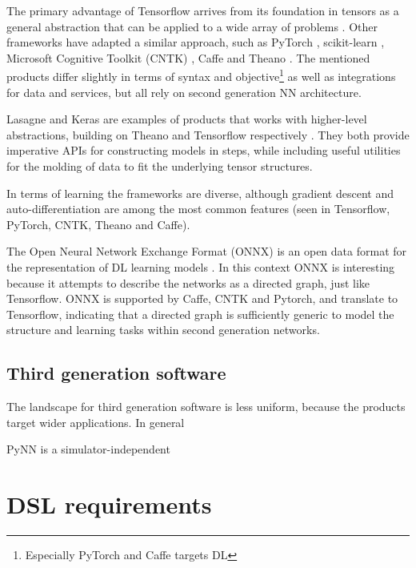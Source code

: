 \documentclass[report.tex]{subfiles}
\begin{document}
The primary advantage of Tensorflow  arrives from 
its foundation in tensors as a general abstraction that
can be applied to a wide array of problems \cite{Abadi2016}.
Other frameworks have adapted a similar approach, such as PyTorch \cite{PyTorch2018}, 
scikit-learn \cite{Sklearn2018}, Microsoft Cognitive Toolkit (CNTK) \cite{CNTK2018},
Caffe \cite{Caffe2018} and Theano \cite{Theano2018}.
The mentioned products differ slightly in terms of syntax and objective\footnote{Especially
PyTorch and Caffe targets \gls{DL}} as well as integrations for data and services, but
all rely on second generation \gls{NN} architecture.

Lasagne and Keras are examples of products that works with higher-level abstractions,
building on Theano and Tensorflow respectively \cite{Lasagne2018, Keras2018}.
They both provide imperative \gls{API}s for constructing models in steps, while
including useful utilities for the molding of data to fit the underlying tensor structures.

In terms of learning the frameworks are diverse, although gradient descent 
and auto-differentiation are among the most common features 
(seen in Tensorflow, PyTorch, CNTK, Theano
and Caffe). 

The Open Neural Network Exchange Format (ONNX) is an open data format for the representation
of \gls{DL} learning models \cite{ONNX2018}. 
In this context ONNX is interesting because it attempts to describe the networks as 
a directed graph, just like Tensorflow.
ONNX is supported by Caffe, CNTK and Pytorch, and translate to Tensorflow,
indicating that a directed graph is 
sufficiently generic to model the structure and learning tasks within 
second generation networks.

\subsection{Third generation software}
The landscape for third generation software is less uniform, because the products target
wider applications.
In general 


PyNN is a simulator-independent

\section{DSL requirements} \label{sec:requirements}




\end{document}
